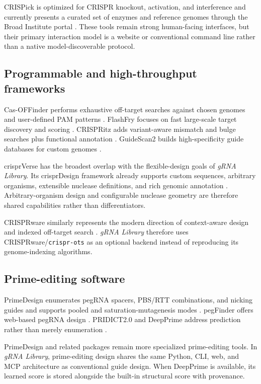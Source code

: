 \documentclass[11pt]{article}
\newcommand{\grnalib}{\textit{gRNA Library}}
\begin{document}
CRISPick is optimized for CRISPR knockout, activation, and interference and currently presents a curated set of enzymes and reference genomes through the Broad Institute portal \citep{crispick2026}. These tools remain strong human-facing interfaces, but their primary interaction model is a website or conventional command line rather than a native model-discoverable protocol.

\subsection{Programmable and high-throughput frameworks}

Cas-OFFinder performs exhaustive off-target searches against chosen genomes and user-defined PAM patterns \citep{bae2014casoffinder}. FlashFry focuses on fast large-scale target discovery and scoring \citep{mckenna2018flashfry}. CRISPRitz adds variant-aware mismatch and bulge searches plus functional annotation \citep{cancellieri2020crispritz}. GuideScan2 builds high-specificity guide databases for custom genomes \citep{schmidt2025guidescan2}.

crisprVerse has the broadest overlap with the flexible-design goals of \grnalib{}. Its crisprDesign framework already supports custom sequences, arbitrary organisms, extensible nuclease definitions, and rich genomic annotation \citep{hoberecht2022crisprverse}. Arbitrary-organism design and configurable nuclease geometry are therefore shared capabilities rather than differentiators.

CRISPRware similarly represents the modern direction of context-aware design and indexed off-target search \citep{malekos2025crisprware}. \grnalib{} therefore uses CRISPRware/\texttt{crispr-ots} as an optional backend instead of reproducing its genome-indexing algorithms.

\subsection{Prime-editing software}

PrimeDesign enumerates pegRNA spacers, PBS/RTT combinations, and nicking guides and supports pooled and saturation-mutagenesis modes \citep{hsu2021primedesign,primedesignGithub}. pegFinder offers web-based pegRNA design \citep{chow2021pegfinder}. PRIDICT2.0 and DeepPrime address prediction rather than merely enumeration \citep{mathis2025pridict2,yu2023deepprime}.

PrimeDesign and related packages remain more specialized prime-editing tools. In \grnalib{}, prime-editing design shares the same Python, CLI, web, and MCP architecture as conventional guide design. When DeepPrime is available, its learned score is stored alongside the built-in structural score with provenance.
\end{document}
